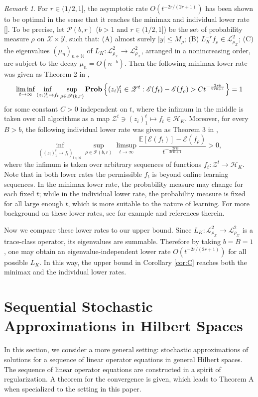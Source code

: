 \documentclass[twoside,11pt]{amsart}
\theoremstyle{theorem}
\theoremstyle{definition}
\theoremstyle{remark}
\newtheorem{rem}[thm]{Remark}
\def\Z{{\mathbb Z}}        %
\def\P{{\mathbb P}}        %
\def\E{{\mathbb E}}        %
\def\L{{\mathscr L}}
\def\L2{{\mathscr L}^2_{\rho_\X}}
\def\M{M_\rho}
\def\H{{\mathscr H}}
\def\P{{\mathscr P}}
\def\X{{\mathscr X}}
\def\Y{{\mathscr Y}}
\def\Z{{\mathscr Z}}
\def\Err{{\mathscr E}}
\def\N{{\mathbb N}}
\def\Prob{{\bf Prob}}
\begin{document}
\begin{rem}
For $r\in (1/2,1]$, the asymptotic rate $O(t^{-2r/(2r+1)})$ has been shown to be optimal in the sense that it reaches the minimax and individual 
lower rate []. To be precise, let $\P(b,r)$ ($b>1$ and $r\in (1/2,1]$) 
be the set of probability measure $\rho$ on $\X\times \Y$, such that: (A) almost surely $|y|\leq \M$;
(B) $L_K^{-r} f_\rho \in \L2$; (C) the eigenvalues $(\mu_n)_{n\in\N}$ of $L_K:\L2\to\L2$, arranged in a nonincreasing order, are subject to the decay $\mu_n= O(n^{-b})$.
Then the following minimax lower rate was given as Theorem 2 in \cite{CapDeV05}, 
\[ \liminf_{t\to \infty} \inf_{(z_i)_1^t \mapsto f_t } \sup_{\rho\in \P(b,r)} \Prob \left\{(z_i)_1^t \in \Z^t: \Err(f_t) - \Err(f_\rho) > 
C t^{-\frac{2rb}{2rb+1}} \right\} = 1 \]
for some constant $C>0$ independent on $t$, where the infimum in the middle is taken over all algorithms as a map 
$\Z^t \ni(z_i)_1^t \mapsto f_t\in \H_K$. Moreover, for every $B>b$, the following individual lower rate was given as Theorem 3 in \cite{CapDeV05},
\[\inf_{((z_i)_1^t\mapsto f_t)_{t\in \N}} \sup_{\rho \in \P(b,r)} \limsup_{t\to \infty} \frac{\E [\Err(f_t)] - \Err(f_\rho)}{t^{-\frac{2rB}{2rB+1}}} > 0, \]
where the infimum is taken over arbitrary sequences of functions $f_t:\Z^t\to \H_K$. Note that in both lower rates the permissible $f_t$ 
is beyond online learning sequences. In the minimax lower rate, the probability measure may change
for each fixed $t$; while in the individual lower rate, the probability measure is fixed for all large enough $t$, which is more suitable to 
the nature of learning. For more background on these lower rates, see for example \cite{GKKW02} and references therein. 

Now we compare these lower rates to our upper bound. 
Since $L_K:\L2\to\L2$ is a trace-class operator, its eigenvalues are summable. Therefore by taking $b=B=1$, one may obtain an 
eigenvalue-independent lower rate $O(t^{-2r/(2r+1)})$ for all possible $L_K$. In this way, the upper bound in Corollary \ref{cor:C} reaches
both the minimax and the individual lower rates. 
\end{rem}


\section{Sequential Stochastic Approximations in Hilbert Spaces} \label{sec:general}

In this section, we consider a more general setting: stochastic approximations of solutions for a sequence of linear operator equations 
in general Hilbert spaces. The sequence of linear operator equations are constructed in a spirit of regularization. 
A theorem for the convergence is given, which leads to Theorem A when specialized to the setting in this paper.
\end{document}

